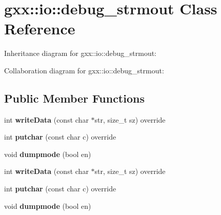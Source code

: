 \hypertarget{classgxx_1_1io_1_1debug__strmout}{}\section{gxx\+:\+:io\+:\+:debug\+\_\+strmout Class Reference}
\label{classgxx_1_1io_1_1debug__strmout}


Inheritance diagram for gxx\+:\+:io\+:\+:debug\+\_\+strmout\+:


Collaboration diagram for gxx\+:\+:io\+:\+:debug\+\_\+strmout\+:
\subsection*{Public Member Functions}
\begin{DoxyCompactItemize}
\item 
int {\bfseries write\+Data} (const char $\ast$str, size\+\_\+t sz) override\hypertarget{classgxx_1_1io_1_1debug__strmout_adb8926ce207b7d278a82f63cfe3c7a83}{}\label{classgxx_1_1io_1_1debug__strmout_adb8926ce207b7d278a82f63cfe3c7a83}

\item 
int {\bfseries putchar} (const char c) override\hypertarget{classgxx_1_1io_1_1debug__strmout_a5a86485ab4721b21b9e7e7cc25784dfc}{}\label{classgxx_1_1io_1_1debug__strmout_a5a86485ab4721b21b9e7e7cc25784dfc}

\item 
void {\bfseries dumpmode} (bool en)\hypertarget{classgxx_1_1io_1_1debug__strmout_a61b908e1b1b31c3356d9a152bb1b7eda}{}\label{classgxx_1_1io_1_1debug__strmout_a61b908e1b1b31c3356d9a152bb1b7eda}

\item 
int {\bfseries write\+Data} (const char $\ast$str, size\+\_\+t sz) override\hypertarget{classgxx_1_1io_1_1debug__strmout_adb8926ce207b7d278a82f63cfe3c7a83}{}\label{classgxx_1_1io_1_1debug__strmout_adb8926ce207b7d278a82f63cfe3c7a83}

\item 
int {\bfseries putchar} (const char c) override\hypertarget{classgxx_1_1io_1_1debug__strmout_a5a86485ab4721b21b9e7e7cc25784dfc}{}\label{classgxx_1_1io_1_1debug__strmout_a5a86485ab4721b21b9e7e7cc25784dfc}

\item 
void {\bfseries dumpmode} (bool en)\hypertarget{classgxx_1_1io_1_1debug__strmout_a61b908e1b1b31c3356d9a152bb1b7eda}{}\label{classgxx_1_1io_1_1debug__strmout_a61b908e1b1b31c3356d9a152bb1b7eda}


\end{DoxyCompactItemize}
